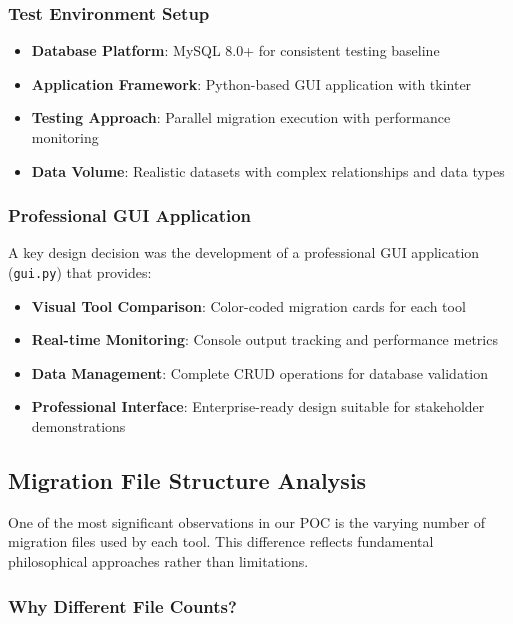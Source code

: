 \documentclass[11pt,a4paper]{article}
\begin{document}
\subsubsection{Test Environment Setup}
\begin{itemize}
\item \textbf{Database Platform}: MySQL 8.0+ for consistent testing baseline
\item \textbf{Application Framework}: Python-based GUI application with tkinter
\item \textbf{Testing Approach}: Parallel migration execution with performance monitoring
\item \textbf{Data Volume}: Realistic datasets with complex relationships and data types
\end{itemize}

\subsubsection{Professional GUI Application}
A key design decision was the development of a professional GUI application (\texttt{gui.py}) that provides:
\begin{itemize}
\item \textbf{Visual Tool Comparison}: Color-coded migration cards for each tool
\item \textbf{Real-time Monitoring}: Console output tracking and performance metrics
\item \textbf{Data Management}: Complete CRUD operations for database validation
\item \textbf{Professional Interface}: Enterprise-ready design suitable for stakeholder demonstrations
\end{itemize}

\subsection{Migration File Structure Analysis}

One of the most significant observations in our POC is the varying number of migration files used by each tool. This difference reflects fundamental philosophical approaches rather than limitations.

\subsubsection{Why Different File Counts?}
\end{document}
